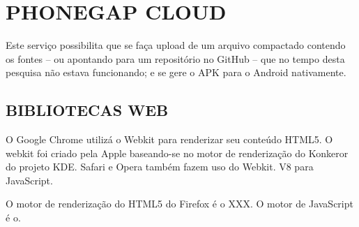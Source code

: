 \documentclass[
12pt,
a4paper,
portuges,
draft
]{report}
\begin{document}
\section{PHONEGAP CLOUD}

Este serviço possibilita que se faça upload de um arquivo compactado
contendo os fontes – ou apontando para um repositório no GitHub –
que no tempo desta pesquisa não estava funcionando; e se gere o APK
para o Android nativamente.


\subsection{BIBLIOTECAS WEB}

O Google Chrome utilizá o Webkit para renderizar seu conteúdo HTML5. O
webkit foi criado pela Apple baseando-se no motor de renderização do
Konkeror do projeto KDE. Safari e Opera também fazem uso do Webkit. V8
para JavaScript.

O motor de renderização do HTML5 do Firefox é o XXX. O motor de
JavaScript é o.
\end{document}
